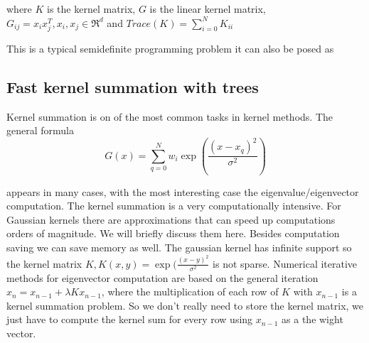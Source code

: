 \documentclass[12pt,letterpaper,doublespaced,ETD,dvips,proposal]{gtthesis}
\begin{document}
\begin{Body}
where $K$ is the kernel matrix, $G$ is the linear kernel matrix,
$G_{ij}=x_i x_j^T, x_i,x_j\in \Re^d$ and
$Trace(K)=\sum_{i=0}^{N}K_{ii}$

This is a typical semidefinite programming problem it can also be
posed as


\subsection{Fast kernel summation with trees} Kernel summation is
on of the most common tasks in kernel methods. The general formula
\begin{equation}
\label{kernel_sum}
  G(x)=\sum_{q=0}^{N} w_i\exp(\frac{(x-x_q)^2}{\sigma^2})
\end{equation}

appears in many cases, with the most interesting case the
eigenvalue/eigenvector computation. The kernel summation is a very
computationally intensive. For Gaussian kernels there are
approximations that can speed up computations orders of magnitude.
We will briefly discuss them here. Besides computation saving we can
save memory as well. The gaussian kernel has infinite support so the
kernel matrix $K, K(x,y)=\exp(\frac{(x-y)^2}{\sigma^2}$ is not
sparse. Numerical iterative methods for eigenvector computation are
based on the general iteration $x_n=x_{n-1}+\lambda Kx_{n-1}$, where
the multiplication of each row of $K$ with $x_{n-1}$ is a kernel
summation problem. So we don't really need to store the kernel
matrix, we just have to compute the kernel sum for every row using
$x_{n-1}$ as a the wight vector.


\end{Body}
\end{document}
